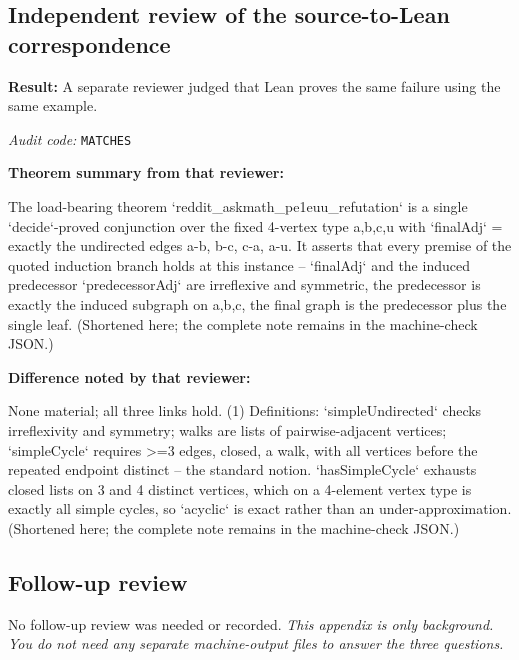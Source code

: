 \documentclass[11pt]{article}
\begin{document}
\subsection*{Independent review of the source-to-Lean correspondence}
\textbf{Result:} A separate reviewer judged that Lean proves the same failure using the same example.
\par\textit{Audit code:} \nolinkurl{MATCHES}
\par\textbf{Theorem summary from that reviewer:}
\begin{Vsrc}
The load-bearing theorem `reddit_askmath_pe1euu_refutation` is a single `decide`-proved conjunction over the fixed 4-vertex type {a,b,c,u} with `finalAdj` = exactly the undirected edges a-b, b-c, c-a, a-u. It asserts that every premise of the quoted induction branch holds at this instance -- `finalAdj` and the induced predecessor `predecessorAdj` are irreflexive and symmetric, the predecessor is exactly the induced subgraph on {a,b,c}, the final graph is the predecessor plus the single leaf. (Shortened here; the complete note remains in the machine-check JSON.)
\end{Vsrc}
\par\textbf{Difference noted by that reviewer:}
\begin{Vsrc}
None material; all three links hold. (1) Definitions: `simpleUndirected` checks irreflexivity and symmetry; walks are lists of pairwise-adjacent vertices; `simpleCycle` requires >=3 edges, closed, a walk, with all vertices before the repeated endpoint distinct -- the standard notion. `hasSimpleCycle` exhausts closed lists on 3 and 4 distinct vertices, which on a 4-element vertex type is exactly all simple cycles, so `acyclic` is exact rather than an under-approximation. (Shortened here; the complete note remains in the machine-check JSON.)
\end{Vsrc}
\subsection*{Follow-up review}
No follow-up review was needed or recorded.
\textit{This appendix is only background. You do not need any separate machine-output files to answer the three questions.}
\end{document}
